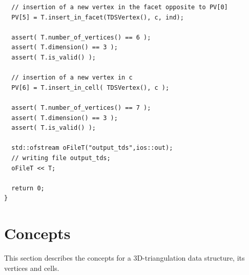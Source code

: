 \begin{verbatim}
  // insertion of a new vertex in the facet opposite to PV[0]
  PV[5] = T.insert_in_facet(TDSVertex(), c, ind);
  
  assert( T.number_of_vertices() == 6 );
  assert( T.dimension() == 3 );
  assert( T.is_valid() );

  // insertion of a new vertex in c
  PV[6] = T.insert_in_cell( TDSVertex(), c );

  assert( T.number_of_vertices() == 7 );
  assert( T.dimension() == 3 );
  assert( T.is_valid() );

  std::ofstream oFileT("output_tds",ios::out);
  // writing file output_tds; 
  oFileT << T; 

  return 0;
}
\end{verbatim}

\clearpage

\section{Concepts}

This section describes the concepts for a 3D-triangulation data
structure, its vertices and cells.

